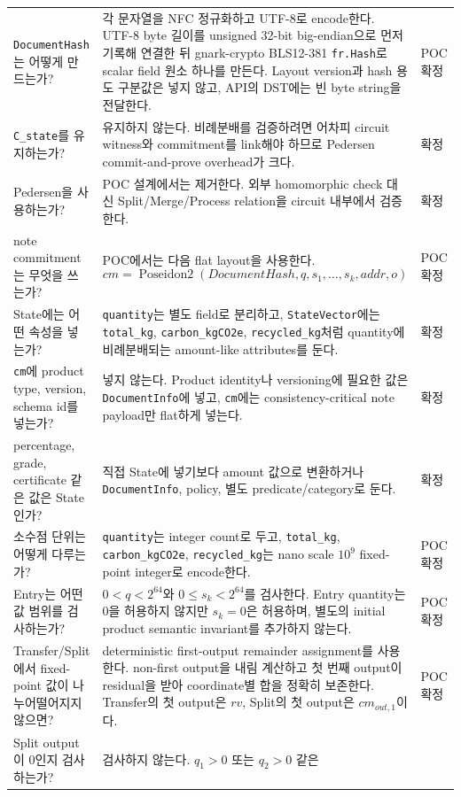 \documentclass[11pt]{extarticle}
\DeclareMathOperator{\PoseidonTwo}{Poseidon2}
\begin{document}
{\begin{longtable}[]{@{}L{0.24\textwidth}L{0.56\textwidth}L{0.12\textwidth}@{}}
\texttt{DocumentHash}는 어떻게 만드는가? &
각 문자열을 NFC 정규화하고 UTF-8로 encode한다. UTF-8 byte 길이를 unsigned
32-bit big-endian으로 먼저 기록해 연결한 뒤
gnark-crypto BLS12-381 \texttt{fr.Hash}로 scalar field 원소 하나를 만든다.
Layout version과 hash 용도 구분값은 넣지 않고, API의 DST에는 빈 byte string을
전달한다. & POC 확정 \\
\texttt{C\_state}를 유지하는가? & 유지하지 않는다. 비례분배를 검증하려면
어차피 circuit witness와 commitment를 link해야 하므로 Pedersen
commit-and-prove overhead가 크다. & 확정 \\
Pedersen을 사용하는가? & POC 설계에서는 제거한다. 외부 homomorphic check
대신 Split/Merge/Process relation을 circuit 내부에서 검증한다. & 확정 \\
note commitment는 무엇을 쓰는가? & POC에서는 다음 flat layout을 사용한다.
\[
cm=\PoseidonTwo(\mathit{DocumentHash},q,s_1,\ldots,s_k,addr,o)
\]
& POC 확정 \\
State에는 어떤 속성을 넣는가? & \texttt{quantity}는 별도 field로
분리하고, \texttt{StateVector}에는 \texttt{total\_kg},
\texttt{carbon\_kgCO2e}, \texttt{recycled\_kg}처럼 quantity에
비례분배되는 amount-like attributes를 둔다. & 확정 \\
\texttt{cm}에 product type, version, schema id를 넣는가? & 넣지 않는다.
Product identity나 versioning에 필요한 값은 \texttt{DocumentInfo}에
넣고, \texttt{cm}에는 consistency-critical note payload만 flat하게
넣는다. & 확정 \\
percentage, grade, certificate 같은 값은 State인가? & 직접 State에
넣기보다 amount 값으로 변환하거나 \texttt{DocumentInfo}, policy, 별도
predicate/category로 둔다. & 확정 \\
소수점 단위는 어떻게 다루는가? & \texttt{quantity}는 integer count로
두고, \texttt{total\_kg}, \texttt{carbon\_kgCO2e},
\texttt{recycled\_kg}는 nano scale $10^9$ fixed-point
integer로 encode한다. & POC 확정 \\
Entry는 어떤 값 범위를 검사하는가? & $0<q<2^{64}$와
$0\leq s_k<2^{64}$를 검사한다. Entry quantity는 0을 허용하지 않지만
$s_k=0$은 허용하며, 별도의 initial product semantic invariant를 추가하지 않는다. & POC 확정 \\
Transfer/Split에서 fixed-point 값이 나누어떨어지지 않으면? &
deterministic first-output remainder assignment를 사용한다. non-first output을
내림 계산하고 첫 번째 output이 residual을 받아 coordinate별 합을 정확히 보존한다.
Transfer의 첫 output은 $rv$, Split의 첫 output은 $cm_{out,1}$이다. & POC 확정 \\
Split output이 0인지 검사하는가? & 검사하지 않는다. $q_1>0$ 또는 $q_2>0$ 같은

\end{longtable}}
\end{document}
